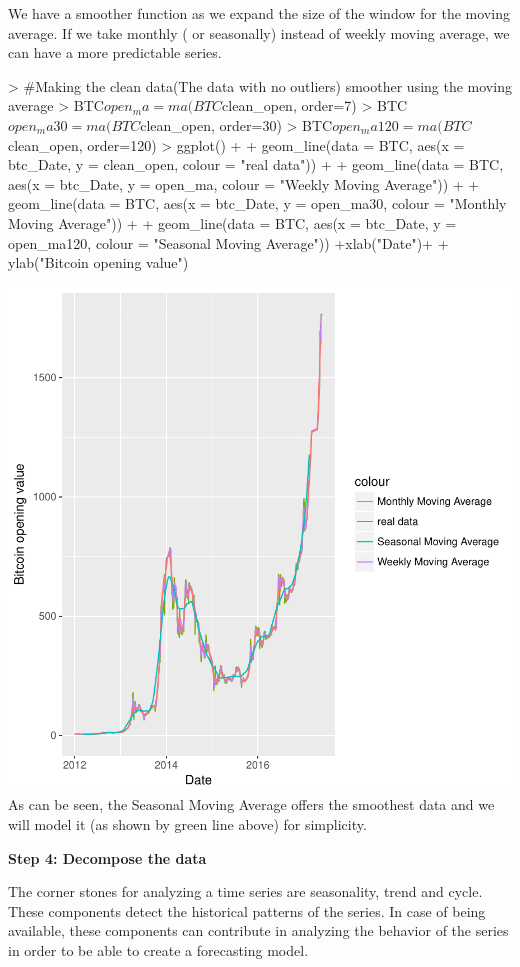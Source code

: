\documentclass{article}
\begin{document}
We have a smoother function as we expand the size of the window for the moving average. If we take monthly ( or seasonally) instead of weekly moving average, we can have a more predictable series.
\begin{Schunk}
\begin{Sinput}
> #Making the clean data(The data with no outliers) smoother using the moving average
> BTC$open_ma = ma(BTC$clean_open, order=7) 
> BTC$open_ma30 = ma(BTC$clean_open, order=30)
> BTC$open_ma120 = ma(BTC$clean_open, order=120)
> ggplot() +
+   geom_line(data = BTC, aes(x = btc_Date, y = clean_open, colour = "real data")) +
+   geom_line(data = BTC, aes(x = btc_Date, y = open_ma,   colour = "Weekly Moving Average"))  +
+   geom_line(data = BTC, aes(x = btc_Date, y = open_ma30, colour = "Monthly Moving Average"))  +
+   geom_line(data = BTC, aes(x = btc_Date, y = open_ma120, colour = "Seasonal Moving Average"))  +xlab("Date")+
+   ylab("Bitcoin opening value")
\end{Sinput}
\end{Schunk}
\includegraphics{Report-010}
As can be seen, the Seasonal Moving Average offers the smoothest data and we will model it (as shown by green line above) for simplicity. 

\textbf{Step 4: Decompose the data}

The corner stones for analyzing a time series are seasonality, trend and cycle. These components detect the historical patterns of the series. In case of being available, these components can contribute in analyzing the behavior of the series in order to be able to create a forecasting model.
\end{document}
